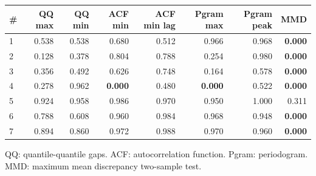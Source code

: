 \documentclass[11pt,a4paper]{article}
\begin{document}
\begin{center}
\begin{tabular}{lrrrrrrr}
\toprule
\# & QQ max & QQ min & ACF min & ACF min lag & Pgram max & Pgram peak & MMD \\
\midrule
1 & 0.538 & 0.538 & 0.680 & 0.512 & 0.966 & 0.968 & \textbf{0.000} \\
2 & 0.128 & 0.378 & 0.804 & 0.788 & 0.254 & 0.980 & \textbf{0.000} \\
3 & 0.356 & 0.492 & 0.626 & 0.748 & 0.164 & 0.578 & \textbf{0.000} \\
4 & 0.278 & 0.962 & \textbf{0.000} & 0.480 & \textbf{0.000} & 0.522 & \textbf{0.000} \\
5 & 0.924 & 0.958 & 0.986 & 0.970 & 0.950 & 1.000 & 0.311 \\
6 & 0.788 & 0.608 & 0.960 & 0.984 & 0.968 & 0.948 & \textbf{0.000} \\
7 & 0.894 & 0.860 & 0.972 & 0.988 & 0.970 & 0.960 & \textbf{0.000} \\
\bottomrule
\end{tabular}
\end{center}

QQ: quantile-quantile gaps. ACF: autocorrelation function. Pgram: periodogram. MMD: maximum mean discrepancy two-sample test.
\end{document}
